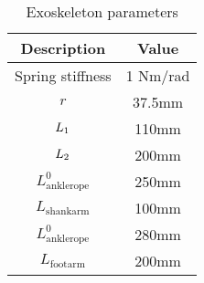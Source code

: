 \documentclass[10pt]{asme2ej}
\begin{document}
\begin{table}[t]
	\caption{Exoskeleton parameters}
	\begin{center}
		\label{tab:Exoskeleton parameters}
		\begin{tabular}{c c}	
			\hline
			\textbf{Description } & \textbf{Value} \\
			\hline
			Spring stiffness & 1 Nm/rad\\
			$r$ & 37.5mm\\
			$L_\textrm1$ & 110mm\\
			$L_\textrm2$ & 200mm\\
			$L_\textrm{anklerope}^0$ & 250mm\\
			$L_\textrm{shankarm}$  & 100mm\\
			$L_\textrm{anklerope}^0$ & 280mm\\
			$L_\textrm{footarm}$ & 200mm\\
			\hline
		\end{tabular}
	\end{center}
\end{table}

\clearpage
\listoffigures
\clearpage
\listoftables
\end{document}
